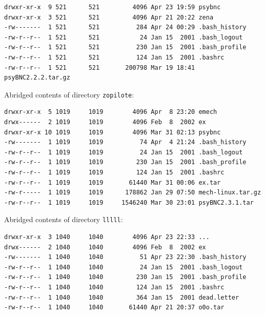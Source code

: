 \vspace{1em}

\begin{lstlisting}[style=terminal]
drwxr-xr-x  9 521      521         4096 Apr 23 19:59 psybnc
drwxr-xr-x  3 521      521         4096 Apr 21 20:22 zena
-rw-------  1 521      521          284 Apr 24 00:29 .bash_history
-rw-r--r--  1 521      521           24 Jan 15  2001 .bash_logout
-rw-r--r--  1 521      521          230 Jan 15  2001 .bash_profile
-rw-r--r--  1 521      521          124 Jan 15  2001 .bashrc
-rw-r--r--  1 521      521       200798 Mar 19 18:41 psyBNC2.2.2.tar.gz
\end{lstlisting}

\vspace{1em}

Abridged contents of directory \texttt{zopilote}:
 
\vspace{1em}

\begin{lstlisting}[style=terminal]
drwxr-xr-x  5 1019     1019        4096 Apr  8 23:20 emech
drwx------  2 1019     1019        4096 Feb  8  2002 ex
drwxr-xr-x 10 1019     1019        4096 Mar 31 02:13 psybnc
-rw-------  1 1019     1019          74 Apr  4 21:24 .bash_history
-rw-r--r--  1 1019     1019          24 Jan 15  2001 .bash_logout
-rw-r--r--  1 1019     1019         230 Jan 15  2001 .bash_profile
-rw-r--r--  1 1019     1019         124 Jan 15  2001 .bashrc
-rw-r--r--  1 1019     1019       61440 Mar 31 00:06 ex.tar
-rw-r-----  1 1019     1019      178862 Jan 29 07:50 mech-linux.tar.gz
-rw-r--r--  1 1019     1019     1546240 Mar 30 23:01 psyBNC2.3.1.tar
\end{lstlisting}

\vspace{1em}

Abridged contents of directory \texttt{lllll}:
 
\vspace{1em}

\begin{lstlisting}[style=terminal]
drwxr-xr-x  3 1040     1040        4096 Apr 23 22:33 ...
drwx------  2 1040     1040        4096 Feb  8  2002 ex
-rw-------  1 1040     1040          51 Apr 23 22:30 .bash_history
-rw-r--r--  1 1040     1040          24 Jan 15  2001 .bash_logout
-rw-r--r--  1 1040     1040         230 Jan 15  2001 .bash_profile
-rw-r--r--  1 1040     1040         124 Jan 15  2001 .bashrc
-rw-r--r--  1 1040     1040         364 Jan 15  2001 dead.letter
-rw-r--r--  1 1040     1040       61440 Apr 21 20:37 o0o.tar
\end{lstlisting}

